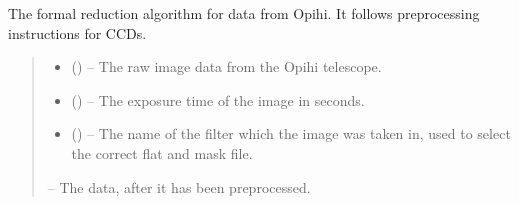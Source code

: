 \documentclass[letterpaper,11pt,english]{sphinxmanual}
\begin{document}
\begin{savenotes}
\begin{fulllineitems}
\begin{savenotes}
\begin{fulllineitems}
\begin{quote}
\begin{description}
\end{description}\end{quote}

\end{fulllineitems}\end{savenotes}


\begin{savenotes}\begin{fulllineitems}
\label{\detokenize{code/opihiexarata.opihi.preprocess:opihiexarata.opihi.preprocess.OpihiPreprocessSolution.preprocess_data_image}}
\pysigstartsignatures
{}
\pysigstopsignatures
\sphinxAtStartPar
The formal reduction algorithm for data from Opihi. It follows
preprocessing instructions for CCDs.
\begin{quote}\begin{description}
\begin{itemize}
\item {} 
\sphinxAtStartPar
{} () – The raw image data from the Opihi telescope.

\item {} 
\sphinxAtStartPar
{} () – The exposure time of the image in seconds.

\item {} 
\sphinxAtStartPar
{} () – The name of the filter which the image was taken in, used to
select the correct flat and mask file.

\end{itemize}

\sphinxAtStartPar
{} – The data, after it has been preprocessed.


\end{description}
\end{quote}
\end{fulllineitems}
\end{savenotes}
\end{fulllineitems}
\end{savenotes}
\end{document}
